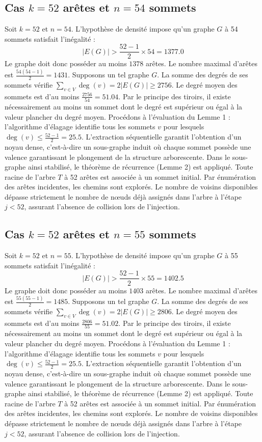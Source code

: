 \documentclass[12pt,a4paper]{article}
\begin{document}
\subsection{Cas $k = 52$ arêtes et $n = 54$ sommets}
Soit $k = 52$ et $n = 54$. L'hypothèse de densité impose qu'un graphe $G$ à 54 sommets satisfait l'inégalité :
$$ |E(G)| > \frac{52-1}{2} \times 54 = 1377.0 $$
Le graphe doit donc posséder au moins $1378$ arêtes. Le nombre maximal d'arêtes est $\frac{54(54-1)}{2} = 1431$.
Supposons un tel graphe $G$. La somme des degrés de ses sommets vérifie $\sum_{v \in V} \deg(v) = 2|E(G)| \geq 2756$.
Le degré moyen des sommets est d'au moins $\frac{2756}{54} = 51.04$.
Par le principe des tiroirs, il existe nécessairement au moins un sommet dont le degré est supérieur ou égal à la valeur plancher du degré moyen.
Procédons à l'évaluation du Lemme 1 : l'algorithme d'élagage identifie tous les sommets $v$ pour lesquels $\deg(v) \leq \frac{52-1}{2} = 25.5$.
L'extraction séquentielle garantit l'obtention d'un noyau dense, c'est-à-dire un sous-graphe induit où chaque sommet possède une valence garantissant le plongement de la structure arborescente.
Dans le sous-graphe ainsi stabilisé, le théorème de récurrence (Lemme 2) est appliqué. Toute racine de l'arbre $T$ à 52 arêtes est associée à un sommet initial. Par énumération des arêtes incidentes, les chemins sont explorés. Le nombre de voisins disponibles dépasse strictement le nombre de nœuds déjà assignés dans l'arbre à l'étape $j < 52$, assurant l'absence de collision lors de l'injection.

\subsection{Cas $k = 52$ arêtes et $n = 55$ sommets}
Soit $k = 52$ et $n = 55$. L'hypothèse de densité impose qu'un graphe $G$ à 55 sommets satisfait l'inégalité :
$$ |E(G)| > \frac{52-1}{2} \times 55 = 1402.5 $$
Le graphe doit donc posséder au moins $1403$ arêtes. Le nombre maximal d'arêtes est $\frac{55(55-1)}{2} = 1485$.
Supposons un tel graphe $G$. La somme des degrés de ses sommets vérifie $\sum_{v \in V} \deg(v) = 2|E(G)| \geq 2806$.
Le degré moyen des sommets est d'au moins $\frac{2806}{55} = 51.02$.
Par le principe des tiroirs, il existe nécessairement au moins un sommet dont le degré est supérieur ou égal à la valeur plancher du degré moyen.
Procédons à l'évaluation du Lemme 1 : l'algorithme d'élagage identifie tous les sommets $v$ pour lesquels $\deg(v) \leq \frac{52-1}{2} = 25.5$.
L'extraction séquentielle garantit l'obtention d'un noyau dense, c'est-à-dire un sous-graphe induit où chaque sommet possède une valence garantissant le plongement de la structure arborescente.
Dans le sous-graphe ainsi stabilisé, le théorème de récurrence (Lemme 2) est appliqué. Toute racine de l'arbre $T$ à 52 arêtes est associée à un sommet initial. Par énumération des arêtes incidentes, les chemins sont explorés. Le nombre de voisins disponibles dépasse strictement le nombre de nœuds déjà assignés dans l'arbre à l'étape $j < 52$, assurant l'absence de collision lors de l'injection.
\end{document}
